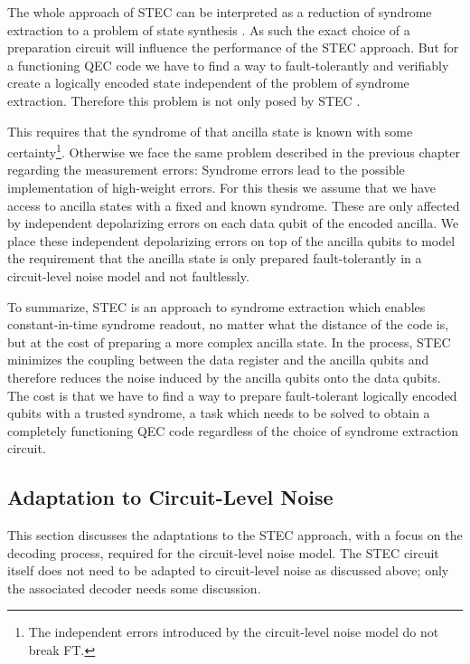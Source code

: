 The whole approach of STEC can be interpreted as a reduction of syndrome extraction to a problem of state synthesis \cite{steane_type_EC_og_paper}. 
As such the exact choice of a preparation circuit will influence the performance of the STEC approach. 
But for a functioning QEC code we have to find a way to fault-tolerantly and verifiably create a logically encoded state independent of the problem of syndrome extraction.
Therefore this problem is not only posed by STEC \cite{steane_type_EC_og_paper}. 

This requires that the syndrome of that ancilla state is known with some certainty\footnote{
    The independent errors introduced by the circuit-level noise model do not break FT. 
}.
Otherwise we face the same problem described in the previous chapter regarding the measurement errors: 
Syndrome errors lead to the possible implementation of high-weight errors.
For this thesis we assume that we have access to ancilla states with a fixed and known syndrome. 
These are only affected by independent depolarizing errors on each data qubit of the encoded ancilla. 
We place these independent depolarizing errors on top of the ancilla qubits to model the requirement 
that the ancilla state is only prepared fault-tolerantly in a circuit-level noise model and not faultlessly.

To summarize, STEC is an approach to syndrome extraction which enables constant-in-time syndrome readout, 
no matter what the distance of the code is, but at the cost of preparing a more complex ancilla state. 
In the process, STEC minimizes the coupling between the data register and the ancilla qubits and 
therefore reduces the noise induced by the ancilla qubits onto the data qubits. 
The cost is that we have to find a way to prepare fault-tolerant logically encoded qubits with a trusted syndrome, 
a task which needs to be solved to obtain a completely functioning QEC code regardless of the choice of syndrome extraction circuit. 

\subsection{Adaptation to Circuit-Level Noise}\label{ssec:stec_decoder_adaption}

This section discusses the adaptations to the STEC approach, with a focus on the decoding process, required for the circuit-level noise model. 
The STEC circuit itself does not need to be adapted to circuit-level noise as discussed above; only the associated decoder needs some discussion. 


